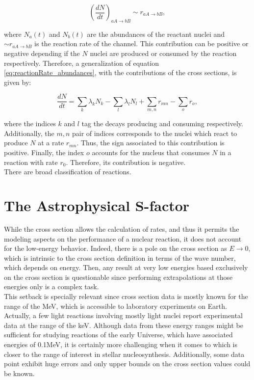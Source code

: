 \documentclass[openany]{book}
\begin{document}
\begin{equation}
		\left(\frac{dN}{dt}\right)_{aA \rightarrow bB} \sim r_{aA \rightarrow bB},
\end{equation}

where $N_a(t)$ and $N_b(t)$ are the abundances of the reactant nuclei and $ \sim r_{aA \rightarrow bB}$ is the reaction rate of the channel. This contribution can be positive or negative depending if the $N$ nuclei are produced or consumed by the reaction respectively. Therefore, a generalization of equation \ref{eq:reactionRate_abundances}, with the contributions of the cross sections, is given by: 

\begin{equation}\label{eq:reactionRate_abundances_general}
	\frac{dN}{dt} =  \sum_{k} {\lambda_k N_k}  - \sum_{l} {\lambda_l N_l} +  \sum_{m, n} {r_{mn}} - \sum_{o} {r_{o}},
\end{equation}

where the indices $k$ and $l$ tag the decays producing and consuming respectively. Additionally, the $m, n$ pair of indices corresponds to the nuclei which react to produce $N$ at a rate $r_{mn}$. Thus, the sign associated to this contribution is positive. Finally, the index $o$ accounts for the nucleus that consumes $N$ in a reaction with rate $r_0$. Therefore, its contribution is negative. \\

There are broad classification of reactions. 

\section{The Astrophysical S-factor} \label{sec:sFactor}

While the cross section allows the calculation of rates, and thus it permits the modeling aspects on the performance of a nuclear reaction, it does not account for the low-energy behavior. Indeed, there is a pole on the cross section as $E \rightarrow 0$, which is intrinsic to the cross section definition in terms of the wave number, which depends on energy. Then, any result at very low energies based exclusively on the cross section is questionable since performing extrapolations at those energies only is a complex task. \\

This setback is specially relevant since cross section data is mostly known for the range of the MeV, which is accessible to laboratory experiments on Earth. Actually, a few light reactions involving mostly light nuclei report experimental data at the range of the keV. Although data from these energy ranges might be sufficient for studying reactions of the early Universe, which have associated energies of 0.1MeV, it is certainly more challenging when it comes to  which is closer to the range of interest in stellar nucleosynthesis. Additionally, some data point exhibit huge errors and only upper bounds on the cross section values could be known. \\
\end{document}
